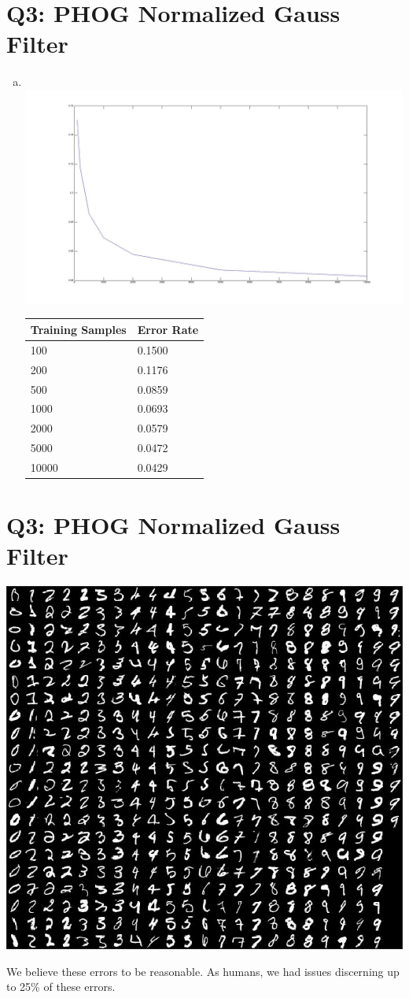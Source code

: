 \documentclass[12pt]{article}
\begin{document}
\section*{Q3: PHOG Normalized Gauss Filter}
  \begin{enumerate}[d.]
    \item \quad \\
      \includegraphics[scale=0.3]{q3_normalized_gauss.jpg}
      \begin{tabular}{l|l}
        \hline
        Training Samples & Error Rate \\
        \hline
        100   & 0.1500 \\
        200   & 0.1176 \\
        500   & 0.0859 \\
        1000  & 0.0693 \\
        2000  & 0.0579 \\
        5000  & 0.0472 \\
        10000 & 0.0429 \\
      \end{tabular}
  \end{enumerate}

\newpage
\section*{Q3: PHOG Normalized Gauss Filter}
  \begin{center}
  \includegraphics[scale=0.75]{q4_phog_normalized_err.jpg}
  \end{center}
  We believe these errors to be reasonable. 
  As humans, we had issues discerning up to 25\% of these errors.
 
  
\end{document}
